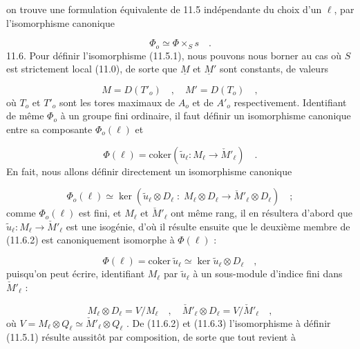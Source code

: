 on trouve une formulation équivalente de 11.5 indépendante du choix d'un $\ell$, par l'isomorphisme canonique

\begin{equation}\tag{11.5.3}
\Phi_o \simeq \Phi \times_S s \quad .
\end{equation}
11.6. Pour définir l'isomorphisme (11.5.1), nous pouvons nous borner au cas où $S$ est strictement local (11.0), de sorte que $\underline{M}$ et $\underline{M}'$ sont constants, de valeurs

\begin{equation}\tag{11.6.1}
M = D(T'_o) \quad , \quad M' = D(T_o) \quad ,
\end{equation}
où $T_o$ et $T'_o$ sont les tores maximaux de $A_o$ et de $A'_o$ respectivement. Identifiant de même $\Phi_o$ à un groupe fini ordinaire, il faut définir un isomorphisme canonique entre sa composante $\Phi_o(\ell)$ et

\begin{equation*}
\Phi(\ell) = \mathrm{coker}(\widetilde{u}_{\ell} : M_{\ell} \longrightarrow \check{M}'_{\ell}) \quad .
\end{equation*}
En fait, nous allons définir directement un isomorphisme canonique

\begin{equation}\tag{11.6.2}
\Phi_o(\ell) \simeq \ker(\widetilde{u}_{\ell}\otimes D_{\ell} \; : \; M_{\ell}\otimes D_{\ell} \longrightarrow \check{M}'_{\ell}\otimes D_{\ell}) \quad ;
\end{equation}
comme $\Phi_o(\ell)$ est fini, et $M_{\ell}$ et $\check{M}'_{\ell}$ ont même rang, il en résultera d'abord que $\widetilde{u}_{\ell} : M_{\ell} \longrightarrow \check{M}'_{\ell}$ est une isogénie, d'où il résulte ensuite que le deuxième membre de (11.6.2) est canoniquement isomorphe à $\Phi(\ell)$ :

\begin{equation}\tag{11.6.3}
\Phi(\ell) = \mathrm{coker}\ \widetilde{u}_{\ell} \simeq \ker \widetilde{u}_{\ell}\otimes D_{\ell} \quad ,
\end{equation}
puisqu'on peut écrire, identifiant $M_{\ell}$ par $\widetilde{u}_{\ell}$ à un sous-module d'indice fini dans $\check{M}'_{\ell}$ :

\begin{equation*}
M_{\ell}\otimes D_{\ell}=V/M_{\ell} \quad , \quad \check{M}'_{\ell}\otimes D_{\ell}=V/\check{M}'_{\ell} \quad ,
\end{equation*}
où $V = M_{\ell}\otimes Q_{\ell} \simeq \check{M}'_{\ell}\otimes Q_{\ell}$ . De (11.6.2) et (11.6.3) l'isomorphisme à définir (11.5.1) résulte aussitôt par composition, de sorte que tout revient à


